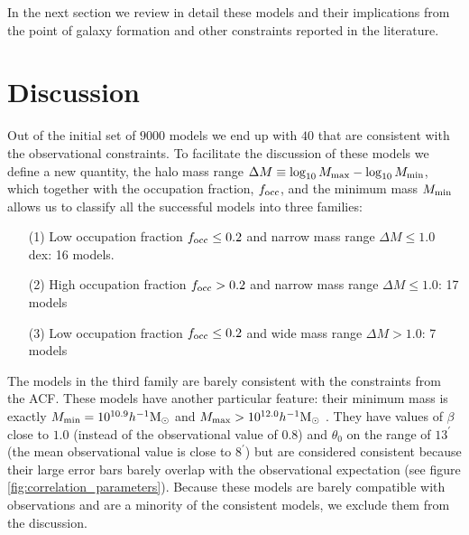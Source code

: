 \documentclass{emulateapj}
\newcommand{\hMsun}{{\ifmmode{h^{-1}{\rm
        {M_{\odot}}}}\else{$h^{-1}{\rm{M_{\odot}}}$}\fi}}
\begin{document}
In the next section we review in detail these models and their
implications from the point of galaxy formation and other
constraints reported in the literature.

\section{Discussion}
\label{sec:discussion}

Out of the initial set of $9000$ models we end up with $40$ that are
consistent with the observational constraints. To facilitate the
discussion of these models we define a new quantity, the halo mass
range $\Delta M\equiv \log_{10}M_{\rm max} - \log_{10}M_{\rm  min}$, which
together with the occupation fraction, $f_{\rm occ}$, and the minimum
mass $M_{\rm min}$ allows us to classify all the successful models into
three families:     
  
\begin{itemize}
\item[(1)] Low occupation fraction $f_{\rm occ}\leq 0.2$ and narrow
  mass range $\Delta M\leq 1.0$ 
  dex: 16 models. 
\item[(2)] High occupation fraction $f_{\rm occ}> 0.2$ and
  narrow mass range $\Delta M\leq 1.0$: 17 models 
\item[(3)] Low occupation fraction $f_{\rm occ}\leq 0.2$ 
  and wide mass range $\Delta M>1.0$: 7 models
\end{itemize}

The models in the third family are barely consistent with the
constraints from the ACF. These models have another particular
feature: their minimum mass is exactly $M_{\rm min}=10^{10.9}\hMsun$
and $M_{\rm max}>10^{12.0}\hMsun$ . They have values of $\beta$
close to $1.0$ (instead of the observational value of $0.8$) and
$\theta_0$ on the range of $13^{\prime}$ (the mean observational
value is close to $8^{\prime}$) but are considered consistent
because their large error bars barely overlap with the observational
expectation (see figure \ref{fig:correlation_parameters}).
Because these models are barely compatible with observations and
are a minority of the consistent models, we exclude them from the
discussion.
\end{document}
